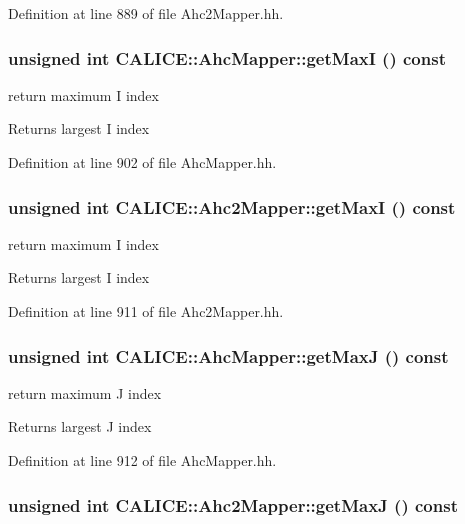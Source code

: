 Definition at line 889 of file Ahc2Mapper.hh.
\subsubsection[{getMaxI}]{\setlength{\rightskip}{0pt plus 5cm}unsigned int CALICE::AhcMapper::getMaxI () const\hspace{0.3cm}{\ttfamily  [inline, inherited]}}\label{group__Range_ga6f9ad0857c90f1e5577f8813a4f22bf6}


return maximum I index \begin{DoxyReturn}{Returns}
largest I index 
\end{DoxyReturn}


Definition at line 902 of file AhcMapper.hh.
\subsubsection[{getMaxI}]{\setlength{\rightskip}{0pt plus 5cm}unsigned int CALICE::Ahc2Mapper::getMaxI () const\hspace{0.3cm}{\ttfamily  [inline, inherited]}}\label{group__Range_gab51db07386bc9b6b7f895fef1a633c67}


return maximum I index \begin{DoxyReturn}{Returns}
largest I index 
\end{DoxyReturn}


Definition at line 911 of file Ahc2Mapper.hh.
\subsubsection[{getMaxJ}]{\setlength{\rightskip}{0pt plus 5cm}unsigned int CALICE::AhcMapper::getMaxJ () const\hspace{0.3cm}{\ttfamily  [inline, inherited]}}\label{group__Range_ga7ffa5fe20d72567f99f92bba2d7b342d}


return maximum J index \begin{DoxyReturn}{Returns}
largest J index 
\end{DoxyReturn}


Definition at line 912 of file AhcMapper.hh.
\subsubsection[{getMaxJ}]{\setlength{\rightskip}{0pt plus 5cm}unsigned int CALICE::Ahc2Mapper::getMaxJ () const\hspace{0.3cm}{\ttfamily  [inline, inherited]}}\label{group__Range_gabec47f8bfddf519fbb06cbc8fb35720e}


